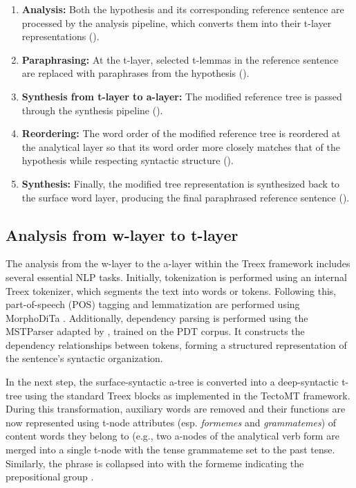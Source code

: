 \begin{enumerate}
\item \textbf{Analysis:} Both the hypothesis and its corresponding reference sentence are processed by the analysis pipeline, which converts them into their t-layer representations ().

\item \textbf{Paraphrasing:} At the t-layer, selected t-lemmas in the reference sentence are replaced with paraphrases from the hypothesis ().

\item \textbf{Synthesis from t-layer to a-layer:} The modified reference tree is passed through the synthesis pipeline ().

\item \textbf{Reordering:} The word order of the modified reference tree is reordered at the analytical layer so that its word order more closely matches that of the hypothesis while respecting syntactic structure ().

\item \textbf{Synthesis:} Finally, the modified tree representation is synthesized back to the surface word layer, producing the final paraphrased reference sentence ().
\end{enumerate}


\subsection{Analysis from w-layer to t-layer}
\label{sect:treex:analysis}
The analysis from the w-layer to the a-layer within the Treex framework includes several essential NLP tasks. Initially, tokenization is performed using an internal Treex tokenizer, which segments the text into words or tokens. Following this, part-of-speech (POS) tagging and lemmatization are performed using MorphoDiTa \citep{morphodita}. Additionally, dependency parsing is performed using the MSTParser \citep{McDonald:2005} adapted by \cite{Novak:2007}, trained on the PDT corpus. It constructs the dependency relationships between tokens, forming a structured representation of the sentence's syntactic organization.


In the next step, the surface-syntactic a-tree is converted into a deep-syntactic t-tree using the standard Treex blocks as implemented in the TectoMT framework. During this transformation, auxiliary words are removed and their functions are now represented using t-node attributes (esp. \textit{formemes} and \textit{grammatemes}) of content words they belong to (e.g., two a-nodes of the analytical verb form  are merged into a single t-node  with the tense grammateme set to the past tense. Similarly, the phrase  is collapsed into  with the formeme indicating the prepositional group .

